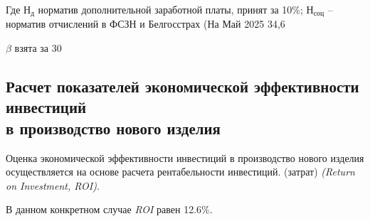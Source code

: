Где $Н_д$ норматив дополнительной заработной платы, принят за 10\%;
$Н_{соц}$ – норматив отчислений в ФСЗН и Белгосстрах (На Май 2025 34,6%



$\beta$ взята за 30%

\subsection{Расчет показателей экономической эффективности инвестиций \\
  в производство нового изделия}
 Оценка экономической эффективности инвестиций в производство нового
изделия осуществляется на основе расчета рентабельности инвестиций.
(затрат) \textit{(Return on Investment, ROI)}.


В данном конкретном случае \textit{ROI} равен 12.6\%.



\newpage

